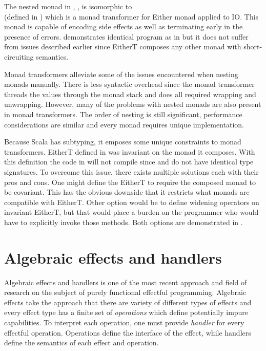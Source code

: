 The nested monad in , , is isomorphic to \\ (defined in ) which is a monad transformer for Either monad applied to IO. This monad is capable of encoding side effects as well as terminating early in the presence of errors.  demonstrates identical program as in  but it does not suffer from issues described earlier since EitherT composes any other monad with short-circuiting semantics.



Monad transformers alleviate some of the issues encountered when nesting monads manually. There is less syntactic overhead since the monad transformer threads the values through the monad stack and does all required wrapping and unwrapping. However, many of the problems with nested monads are also present in monad transformers. The order of nesting is still significant, performance considerations are similar and every monad requires unique implementation. 

Because Scala has subtyping, it emposes some unique constraints to monad transformers. EitherT defined in  was invariant on the monad it composes. With this definition the code in  will not compile since  and  do not have identical type signatures. To overcome this issue, there exists multiple solutions each with their pros and cons. One might define the EitherT to require the composed monad to be covariant. This has the obvious downside that it restricts what monads are compatible with EitherT. Other option would be to define widening operators on invariant EitherT, but that would place a burden on the programmer who would have to explicitly invoke those methods. Both options are demonstrated in .






\section{Algebraic effects and handlers} \label{background:alg-eff}
Algebraic effects and handlers is one of the most recent approach and field of research on the subject of purely functional effectful programming. Algebraic effects take the approach that there are variety of different types of effects and every effect type has a finite set of \textit{operations} which define potentially impure capabilities. To interpret each operation, one must provide \textit{handler} for every effectful operation. Operations define the interface of the effect, while handlers define the semantics of each effect and operation.

